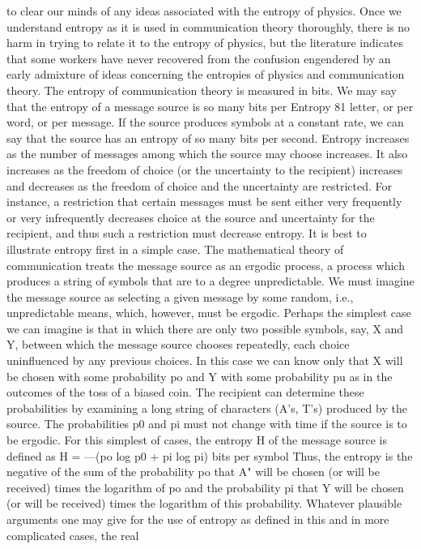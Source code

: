 to clear our minds of any ideas associated with the entropy of
physics. Once we understand entropy as it is used in communication
theory thoroughly, there is no harm in trying to relate it to
the entropy of physics, but the literature indicates that some
workers have never recovered from the confusion engendered by
an early admixture of ideas concerning the entropies of physics
and communication theory.
The entropy of communication theory is measured in bits. We
may say that the entropy of a message source is so many bits per
Entropy 81
letter, or per word, or per message. If the source produces symbols
at a constant rate, we can say that the source has an entropy of
so many bits per second.
Entropy increases as the number of messages among which the
source may choose increases. It also increases as the freedom of
choice (or the uncertainty to the recipient) increases and decreases
as the freedom of choice and the uncertainty are restricted. For
instance, a restriction that certain messages must be sent either very
frequently or very infrequently decreases choice at the source and
uncertainty for the recipient, and thus such a restriction must
decrease entropy.
It is best to illustrate entropy first in a simple case. The mathematical
theory of communication treats the message source as an
ergodic process, a process which produces a string of symbols that
are to a degree unpredictable. We must imagine the message source
as selecting a given message by some random, i.e., unpredictable
means, which, however, must be ergodic. Perhaps the simplest case
we can imagine is that in which there are only two possible symbols,
say, X and Y, between which the message source chooses
repeatedly, each choice uninfluenced by any previous choices. In
this case we can know only that X will be chosen with some
probability po and Y with some probability pu as in the outcomes
of the toss of a biased coin. The recipient can determine these
probabilities by examining a long string of characters (A’s, T’s)
produced by the source. The probabilities p0 and pi must not
change with time if the source is to be ergodic.
For this simplest of cases, the entropy H of the message source
is defined as
H = —(po log p0 + pi log pi) bits per symbol
Thus, the entropy is the negative of the sum of the probability po
that A" will be chosen (or will be received) times the logarithm of
po and the probability pi that Y will be chosen (or will be received)
times the logarithm of this probability.
Whatever plausible arguments one may give for the use of
entropy as defined in this and in more complicated cases, the real
